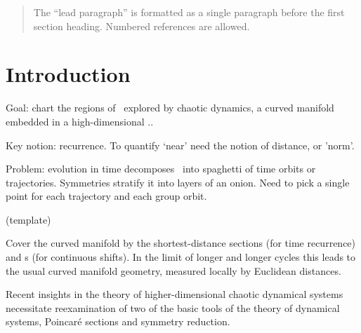 
\begin{quotation}
    \ifdraft\color{blue}
The ``lead paragraph'' is formatted as a single paragraph before the first
section heading. Numbered references are allowed.
    \color{black}\fi
\end{quotation}


\section{Introduction}
\label{s:intro}

    \ifdraft\color{blue}
Goal: chart the regions of \statesp\ explored by chaotic dynamics,
a curved manifold embedded in a high-dimensional \statesp..

Key notion: recurrence.
To quantify `near' need the notion of distance, or 'norm'.

Problem: evolution in time decomposes \statesp\ into spaghetti of time
orbits or trajectories. Symmetries stratify it into layers of an onion.
Need to pick a single point for each trajectory and each group orbit.

(template)

Cover the curved manifold by the shortest-distance sections (for time
recurrence) and \slice s (for continuous shifts). In the limit of longer
and longer cycles this leads to the usual curved manifold geometry,
measured locally by Euclidean distances.
    \color{black}\fi

Recent insights in the theory of higher-dimensional chaotic dynamical systems
necessitate reexamination of two of the basic tools of the theory of
dynamical systems, Poincar\'e sections and symmetry reduction.

